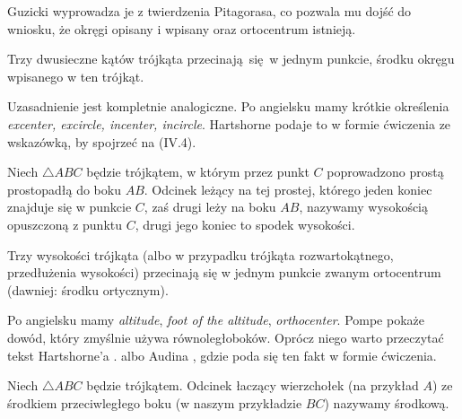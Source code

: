 Guzicki \cite[s. 176]{guzicki_2021} wyprowadza je z twierdzenia Pitagorasa, co pozwala mu dojść do wniosku, że okręgi opisany i wpisany oraz ortocentrum istnieją.

\begin{proposition}
    Trzy dwusieczne kątów trójkąta przecinają się w jednym punkcie, środku okręgu wpisanego w ten trójkąt.
\end{proposition}

Uzasadnienie jest kompletnie analogiczne.
Po angielsku mamy krótkie określenia \emph{excenter, excircle, incenter, incircle}.
Hartshorne \cite[s. 16]{hartshorne2000} podaje to w formie ćwiczenia ze wskazówką, by spojrzeć na (IV.4).

\begin{definition}[wysokość]
%
    Niech $\triangle ABC$ będzie trójkątem, w którym przez punkt $C$ poprowadzono prostą prostopadłą do boku $AB$.
    Odcinek leżący na tej prostej, którego jeden koniec znajduje się w punkcie $C$, zaś drugi leży na boku $AB$, nazywamy wysokością opuszczoną z punktu $C$, drugi jego koniec to spodek wysokości.
\end{definition}


\begin{proposition}
\label{wysokosci_przecinaja_sie}%
	Trzy wysokości trójkąta (albo w przypadku trójkąta rozwartokątnego, przedłużenia wysokości) przecinają się w jednym punkcie zwanym ortocentrum (dawniej: środku ortycznym).
%
\end{proposition}

Po angielsku mamy \emph{altitude}, \emph{foot of the altitude}, \emph{orthocenter}.
Pompe \cite[s. 38]{pompe_2022} pokaże dowód, który zmyślnie używa równoległoboków.
Oprócz niego warto przeczytać tekst Hartshorne'a \cite[s. 54]{hartshorne2000}. albo Audina \cite[s. 61]{audin_2003}, gdzie poda się ten fakt w formie ćwiczenia.

\begin{definition}[środkowa]
%
    Niech $\triangle ABC$ będzie trójkątem.
    Odcinek łaczący wierzchołek (na przykład $A$) ze środkiem przeciwległego boku (w naszym przykładzie $BC$) nazywamy środkową.
\end{definition}

